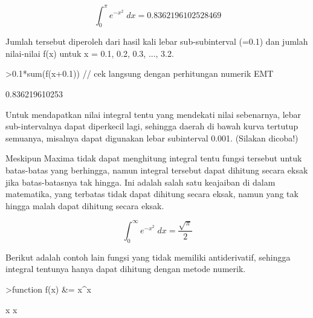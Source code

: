 \documentclass{article}
\begin{document}
\begin{eulernotebook}
\begin{eulercomment}
\begin{eulercomment}
\begin{eulercomment}
\end{eulercomment}
\begin{eulerformula}
\[
\int_{0}^{\pi}{e^ {- x^2 }\;dx}=0.8362196102528469
\]
\end{eulerformula}
\begin{eulercomment}
Jumlah tersebut diperoleh dari hasil kali lebar sub-subinterval (=0.1)
dan jumlah nilai-nilai f(x) untuk x = 0.1, 0.2, 0.3, ..., 3.2.
\end{eulercomment}
\begin{eulerprompt}
>0.1*sum(f(x+0.1)) // cek langsung dengan perhitungan numerik EMT
\end{eulerprompt}
\begin{euleroutput}
  0.836219610253
\end{euleroutput}
\begin{eulercomment}
Untuk mendapatkan nilai integral tentu yang mendekati nilai sebenarnya, lebar
sub-intervalnya dapat diperkecil lagi, sehingga daerah di bawah kurva tertutup
semuanya, misalnya dapat digunakan lebar subinterval 0.001. (Silakan dicoba!)

Meskipun Maxima tidak dapat menghitung integral tentu fungsi tersebut untuk
batas-batas yang berhingga, namun integral tersebut dapat dihitung secara eksak jika
batas-batasnya tak hingga. Ini adalah salah satu keajaiban di dalam matematika, yang
terbatas tidak dapat dihitung secara eksak, namun yang tak hingga malah dapat
dihitung secara eksak.
\end{eulercomment}
\begin{eulerformula}
\[
\int_{0}^{\infty }{e^ {- x^2 }\;dx}=\frac{\sqrt{\pi}}{2}
\]
\end{eulerformula}
\begin{eulercomment}
Berikut adalah contoh lain fungsi yang tidak memiliki antiderivatif, sehingga
integral tentunya hanya dapat dihitung dengan metode numerik.
\end{eulercomment}
\begin{eulerprompt}
>function f(x) &= x^x
\end{eulerprompt}
\begin{euleroutput}
  
                                     x
                                    x
  

\end{euleroutput}
\end{eulercomment}
\end{eulercomment}
\end{eulernotebook}
\end{document}
